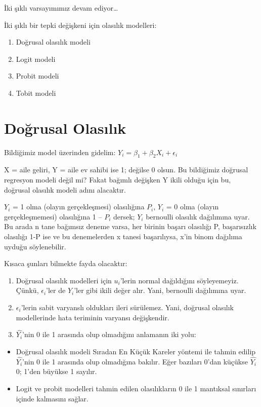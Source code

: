 \documentclass[
]{book}
\begin{document}
İki şıklı varsayımımız devam ediyor\ldots{}

İki şıklı bir tepki değişkeni için olasılık modelleri:

\begin{enumerate}
\def\labelenumi{\roman{enumi}.}
\item
  Doğrusal olasılık modeli
\item
  Logit modeli
\item
  Probit modeli
\item
  Tobit modeli
\end{enumerate}

\hypertarget{doux11frusal-olasux131lux131k}{%
\section{Doğrusal Olasılık}\label{doux11frusal-olasux131lux131k}}

Bildiğimiz model üzerinden gidelim: \(Y_i = \beta_1 + \beta_2X_i + \epsilon_i\)

X = aile geliri, Y = aile ev sahibi ise 1; değilse 0 olsun. Bu bildiğimiz doğrusal regresyon modeli değil mi? Fakat bağımlı değişken Y ikili olduğu için bu, doğrusal olasılık modeli adını alacaktır.

\(Y_i\) = 1 olma (olayın gerçekleşmesi) olasılığına \(P_i\), \(Y_i\) = 0 olma (olayın gerçekleşmemesi) olasılığına 1 -- \(P_i\) dersek; \(Y_i\) bernoulli olasılık dağılımına uyar. Bu arada n tane bağımsız deneme varsa, her birinin başarı olasılığı P, başarısızlık olasılığı 1-P ise ve bu denemelerden x tanesi başarılıysa, x'in binom dağılıma uyduğu söylenebilir.

Kısaca şunları bilmekte fayda olacaktır:

\begin{enumerate}
\def\labelenumi{\roman{enumi}.}
\item
  Doğrusal olasılık modelleri için \(u_i\)'lerin normal dağıldığını söyleyemeyiz. Çünkü, \(\epsilon_i\)'ler de \(Y_i\)'ler gibi ikili değer alır. Yani, bernoulli dağılımına uyar.
\item
  \(\epsilon_i\)'lerin sabit varyanslı oldukları ileri sürülemez. Yani, doğrusal olasılık modellerinde hata teriminin varyansı değişkendir.
\item
  \(\hat{Y_i}\)'nin 0 ile 1 arasında olup olmadığını anlamanın iki yolu:
\end{enumerate}

\begin{itemize}
\item
  Doğrusal olasılık modeli Sıradan En Küçük Kareler yöntemi ile tahmin edilip \(\hat{Y_i}\)'nin 0 ile 1 arasında olup olmadığına bakılır. Eğer bazıları 0'dan küçükse \(\hat{Y_i}\) 0; 1'den büyükse 1 sayılır.
\item
  Logit ve probit modelleri tahmin edilen olasılıkların 0 ile 1 mantıksal sınırları içinde kalmasını sağlar.
\end{itemize}
\end{document}
